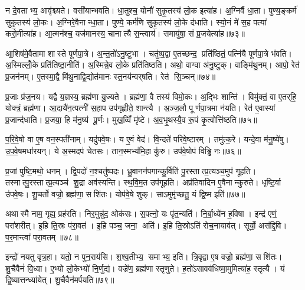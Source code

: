 न दे॒वताभ्य॒ आवृ॑श्च्यते। वसी॑यान्भवति। धा॒तुश्च॒ योनौ॑ सुकृ॒तस्य॑ लो॒क इत्या॑ह। अ॒ग्निर्वै धा॒ता। पुण्य॒ङ्कर्म॑ सुकृ॒तस्य॑ लो॒कः। अ॒ग्निरे॒वैनान्धा॒ता। पुण्ये॒ कर्म॑णि सुकृ॒तस्य॑ लो॒के द॑धाति। स्यो॒नं मे॑ स॒ह पत्या॑ करो॒मीत्या॑ह। आ॒त्मन॑श्च॒ यज॑मानस्य॒ चानात्यै स॒न्त्वाय॑। समायु॑षा॒ सं प्र॒जयेत्या॑ह॥७३॥

आ॒शिष॑मे॒वैतामा शास्ते पूर्णपा॒त्रे। अ॒न्त॒तो॑ऽनु॒ष्टुभा। चतु॑ष्प॒द्वा ए॒तच्छन्द॒ प्रति॑ष्ठितं॒ पत्नि॑यै पूर्णपा॒त्रे भ॑वति। अ॒स्मिल्लोँ॒के प्रति॑तिष्ठा॒नीति॑। अ॒स्मिन्ने॒व लो॒के प्रति॑तिष्ठति। अथो॒ वाग्वा अ॑नु॒ष्टुक्। वाङ्मि॑थु॒नम्। आपो॒ रेत॑ प्र॒जन॑नम्। ए॒तस्मा॒द्वै मि॑थु॒नाद्वि॒द्योत॑मानः स्त॒नय॑न्वर्‌षति। रेत॑ सि॒ञ्चन्॥७४॥

प्र॒जाः प्र॑ज॒नय\sn{}। यद्वै य॒ज्ञस्य॒ ब्रह्म॑णा यु॒ज्यते। ब्रह्म॑णा॒ वै तस्य॑ विमो॒कः। अ॒द्भिः शान्ति॑। विमु॑क्तं॒ वा ए॒तर्‌हि॒ योक्त्रं॒ ब्रह्म॑णा। आ॒दायै॑न॒त्पत्नी॑ स॒हाप उप॑गृह्णीते॒ शान्त्यै। अ॒ञ्ज॒लौ पूर्णपा॒त्रमा न॑यति। रेत॑ ए॒वास्यां प्र॒जान्द॑धाति। प्र॒जया॒ हि म॑नु॒ष्य॑ पू॒र्णः। मुख॒व्विँ मृ॑ष्टे। अ॒व॒भृ॒थस्यै॒व रू॒पं कृ॒त्वोत्ति॑ष्ठति॥७५॥\anuvakamend[स॒वि॒तृप्र॑सूतो यथादेव॒तं प्र॒जयेत्या॑ह सि॒ञ्चन्मृ॑ष्ट॒ एकं च]

प॒रि॒वे॒षो वा ए॒ष वन॒स्पती॑नाम्। यदु॑पवे॒षः। य ए॒वं वेद॑। वि॒न्दते॑ परिवे॒ष्टारम्। तमु॑त्क॒रे। यन्दे॒वा म॑नु॒ष्ये॑षु। उ॒प॒वे॒षमधा॑रयन्। ये अ॒स्मदप॑ चेतसः। तान॒स्मभ्य॑मि॒हा कु॑रु। उप॑वे॒षोप॑ विड्ढि नः॥७६॥

प्र॒जां पुष्टि॒मथो॒ धनम्। द्वि॒पदो॑ न॒श्चतु॑ष्पदः। ध्रु॒वानन॑पगान्कु॒र्विति॑ पु॒रस्तात्प्र॒त्यञ्च॒मुप॑ गूहति। तस्मात्पु॒रस्तात्प्र॒त्यञ्च॑ शू॒द्रा अव॑स्यन्ति। स्थ॒वि॒म॒त उप॑गूहति। अप्र॑तिवादिन ए॒वैनान्कुरुते। धृष्टि॒र्वा उ॑पवे॒षः। शु॒चर्तो वज्रो॒ ब्रह्म॑णा॒ सशि॑तः। योप॑वे॒षे शुक्। साऽमुमृ॑च्छतु॒ यं द्वि॒ष्म इति॑॥७७॥

अथास्मै नाम॒ गृह्य॒ प्रह॑रति। निर॒मुन्नु॑द॒ ओक॑सः। स॒पत्नो॒ यः पृ॑त॒न्यति॑। नि॒र्बा॒ध्ये॑न ह॒विषा। इन्द्र॑ एणं॒ परा॑शरीत्। इ॒हि ति॒स्रः प॑रा॒वत॑। इ॒हि पञ्च॒ जना॒ अति॑। इ॒हि ति॒स्रोऽति॑ रोच॒नायाव॑त्। सूर्यो॒ अस॑द्दि॒वि। प॒र॒मान्त्वा॑ परा॒वतम्॥७८॥

इन्द्रो॑ नयतु वृत्र॒हा। यतो॒ न पुन॒राय॑सि। श॒श्व॒तीभ्य॒ समाभ्य॒ इति॑। त्रि॒वृद्वा ए॒ष वज्रो॒ ब्रह्म॑णा॒ सशि॑तः। शु॒चैवैनं॑ वि॒ध्वा। ए॒भ्यो लो॒केभ्यो॑ नि॒र्णुद्य॑। वज्रे॑ण॒ ब्रह्म॑णा स्तृणुते। ह॒तो॑ऽसावव॑धिष्मा॒मुमित्या॑ह॒ स्तृत्यै। यं द्वि॒ष्यात्तन्ध्या॑येत्। शु॒चैवैन॑मर्पयति॥७९॥


